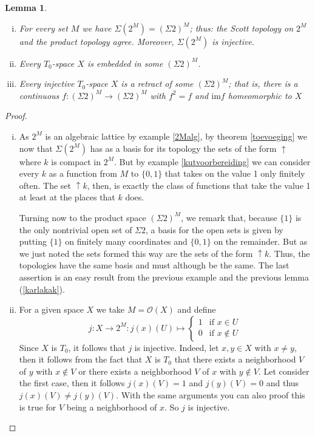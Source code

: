 \documentclass[a4paper,12pt]{article}
\newtheorem{lemma}[theorem]{Lemma}
\begin{document}
\begin{lemma}\label{overbodigheidgehoopt}
\begin{enumerate}[(i)]
  \item For every set $M$ we have $\Sigma(2^M) = (\Sigma 2)^M$; thus: the Scott topology on $2^M$ and the product topology agree. Moreover, $\Sigma(2^M)$ is injective.
  \item Every $T_0$-space $X$ is embedded in some $(\Sigma 2)^M$.
  \item Every injective $T_0$-space $X$ is a retract of some $(\Sigma 2)^M$; that is, there is a continuous $f: (\Sigma 2)^M \to (\Sigma 2)^M$ with $f^2 = f$ and $\text{im} f$ homeomorphic to $X$
\end{enumerate}

\end{lemma}
\begin{proof}
\begin{enumerate}[(i)]
\item As $2^M$ is an algebraic lattice by example \ref{2Malg}, by theorem \ref{toevoeging} we now that $\Sigma(2^M)$ has as a basis for its topology the sets of the form $\uparrow$ where $k$ is compact in $2^M$. But by example \ref{kutvoorbereiding} we can consider every $k$ as a function from $M$ to $\{0, 1\}$ that takes on the value 1 only finitely often. The set $\uparrow k$, then, is exactly the class of functions that take the value 1 at least at the places that $k$ does.

Turning now to the product space $(\Sigma 2)^M$, we remark that, because $\{1\}$ is the only nontrivial open set of $\Sigma 2$, a basis for the open sets is given by putting $\{1\}$ on finitely many coordinates and $\{0, 1\}$ on the remainder. But as we just noted the sets formed this way are the sets of the form $\uparrow k$. Thus, the topologies have the same basis and must although be the same. The last assertion is an easy result from the previous example and the previous lemma (\ref{karlakak}).

\item For a given space $X$ we take $M = \mathcal{O}(X)$ and define 
\begin{equation*}
  j: X \to 2^M: j(x)(U) \mapsto \begin{cases}
    1 & \text{if $x \in U$}\\
    0 & \text{if $x \not\in U$}
  \end{cases}
\end{equation*}
Since $X$ is $T_0$, it follows that $j$ is injective. Indeed, let $x, y \in X$ with $x \neq y$, then it follows from the fact that $X$ is $T_0$ that there exists a neighborhood $V$ of $y$ with $x \not\in V$ or there exists a neighborhood $V$ of $x$ with $y \not\in V$. Let consider the first case, then it follows $j(x)(V)= 1$ and $j(y)(V) = 0$ and thus $j(x)(V) \neq j(y)(V)$. With the same arguments you can also proof this is true for $V$ being a neighborhood of $x$. So $j$ is injective.


\end{enumerate}
\end{proof}
\end{document}
